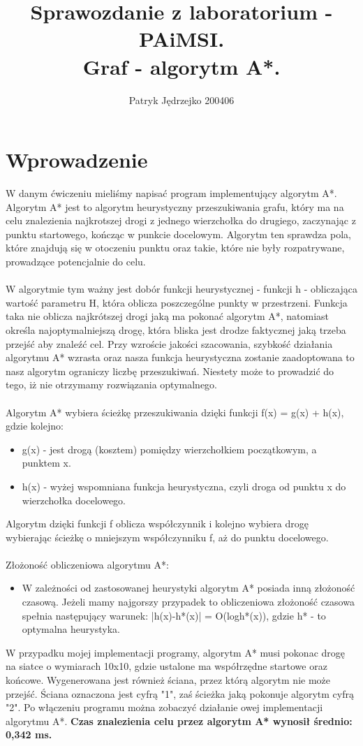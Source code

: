 \documentclass{article}
\author{Patryk Jędrzejko 200406}
\title{Sprawozdanie z laboratorium - PAiMSI. \\Graf - algorytm A*.}
\begin{document}
\maketitle

\section{Wprowadzenie}
W danym ćwiczeniu mieliśmy napisać program implementujący algorytm A*.
Algorytm A* jest to algorytm heurystyczny przeszukiwania grafu, który ma na celu znalezienia najkrotszej drogi z jednego wierzchołka do drugiego, zaczynając z punktu startowego, kończąc w punkcie docelowym. Algorytm ten sprawdza pola, które znajdują się w otoczeniu punktu oraz takie, które nie były rozpatrywane, prowadzące potencjalnie do celu. 
\\\\ W algorytmie tym ważny jest dobór funkcji heurystycznej - funkcji h - obliczająca wartość parametru H, która oblicza poszczególne punkty w przestrzeni. Funkcja taka nie oblicza najkrótszej drogi jaką ma pokonać algorytm A*, natomiast określa najoptymalniejszą drogę, która bliska jest drodze faktycznej jaką trzeba przejść aby znaleźć cel. Przy wzroście jakości szacowania, szybkość działania algorytmu A* wzrasta oraz nasza funkcja heurystyczna zostanie zaadoptowana to nasz algorytm ograniczy liczbę przeszukiwań. Niestety może to prowadzić do tego, iż nie otrzymamy rozwiązania optymalnego.
\\\\ Algorytm A* wybiera ścieżkę przeszukiwania dzięki funkcji f(x) = g(x) + h(x), gdzie kolejno:
\begin{itemize}
  \item g(x) - jest drogą (kosztem) pomiędzy wierzchołkiem początkowym, a punktem x. 
  \item h(x) - wyżej wspomniana funkcja heurystyczna, czyli droga od punktu x do wierzchołka docelowego.
\end{itemize}
Algorytm dzięki funkcji f oblicza współczynnik i kolejno wybiera drogę wybierając ścieżkę o mniejszym współczynniku f, aż do punktu docelowego.
\\\\Złożoność obliczeniowa algorytmu A*:
\begin{itemize}
  \item W zależności od zastosowanej heurystyki algorytm A* posiada inną złożoność czasową. Jeżeli mamy najgorszy przypadek to obliczeniowa złożoność czasowa spełnia następujący warunek: 
|h(x)-h*(x)| = O(logh*(x)), gdzie h* - to optymalna heurystyka. 
\end{itemize}
W przypadku mojej implementacji programy, algorytm A* musi pokonac drogę na siatce o wymiarach 10x10, gdzie ustalone ma współrzędne startowe oraz końcowe. Wygenerowana jest również ściana, przez którą algorytm nie może przejść. Ściana oznaczona jest cyfrą "1", zaś ścieżka jaką pokonuje algorytm cyfrą "2". Po włączeniu programu można zobaczyć działanie owej implementacji algorytmu A*. \textbf{Czas znalezienia celu przez algorytm A* wynosił średnio: 0,342 ms. }
\end{document}
